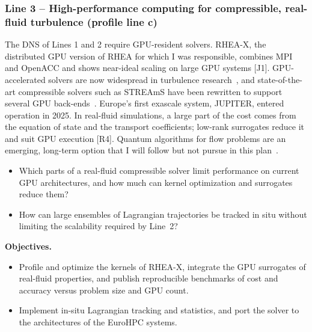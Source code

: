 \documentclass[11pt]{article}
\begin{document}
\subsubsection*{Line 3 -- High-performance computing for compressible, real-fluid
turbulence (profile line c)}
The DNS of Lines 1 and 2 require GPU-resident solvers. RHEA-X, the distributed GPU version of
RHEA for which I was responsible, combines MPI and OpenACC and shows near-ideal scaling on
large GPU systems [J1]. GPU-accelerated solvers are now widespread in turbulence
research~\cite{Roccon2026}, and state-of-the-art compressible solvers such as STREAmS have been
rewritten to support several GPU back-ends~\cite{Bernardini2021,Bernardini2023}. Europe's first exascale
system, JUPITER, entered operation in 2025. In real-fluid simulations, a large part of the cost
comes from the equation of state and the transport coefficients; low-rank surrogates reduce
it and suit GPU execution [R4]. Quantum algorithms for flow problems are an emerging,
long-term option that I will follow but not pursue in this plan~\cite{Bharadwaj2023}.
\begin{itemize}
  \item[\textbf{Q3.1}] Which parts of a real-fluid compressible solver limit performance on
  current GPU architectures, and how much can kernel optimization and surrogates reduce them?
  \item[\textbf{Q3.2}] How can large ensembles of Lagrangian trajectories be tracked in situ
  without limiting the scalability required by Line~2?
\end{itemize}
\textbf{Objectives.}
\begin{itemize}
  \item[\textbf{O7.}] Profile and optimize the kernels of RHEA-X, integrate the GPU surrogates
  of real-fluid properties, and publish reproducible benchmarks of cost and accuracy versus
  problem size and GPU count.
  \item[\textbf{O8.}] Implement in-situ Lagrangian tracking and statistics, and port the
  solver to the architectures of the EuroHPC systems.
\end{itemize}
\end{document}
